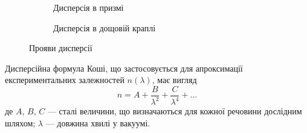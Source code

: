 \begin{figure}[h!]\centering
	\begin{subfigure}{0.45\linewidth}
		
		\caption{Дисперсія в призмі}
		\label{pic:Prism_dispersion}
	\end{subfigure}
	\begin{subfigure}{0.45\linewidth}
		
		\caption{Дисперсія в дощовій краплі}
		\label{pic:Droplet_dispersion}
	\end{subfigure}
	\caption{Прояви дисперсії}
	\label{pic:dispersion}
\end{figure}

Дисперсійна формула Коші, що застосовується для апроксимації
експериментальних залежностей $n(\lambda)$, має вигляд
\begin{equation}\label{eq:Cauchi_dispersion}
	n = A + \frac{B}{\lambda^2} + \frac{C}{\lambda^4} + \ldots
\end{equation}
де $A$, $B$, $C$ --- сталі величини, що визначаються для кожної речовини
дослідним шляхом; $\lambda$ --- довжина хвилі у вакуумі.








%    


